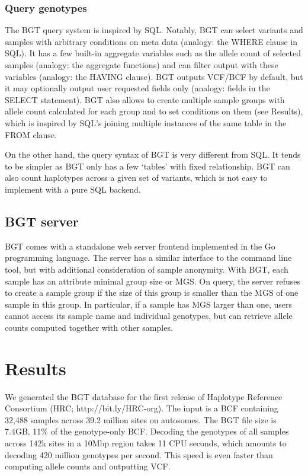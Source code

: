 \documentclass{bioinfo}
\begin{document}
\begin{methods}
\subsubsection{Query genotypes}

The BGT query system is inspired by SQL.  Notably, BGT can select variants and
samples with arbitrary conditions on meta data (analogy: the {\sf WHERE} clause
in SQL). It has a few built-in aggregate variables such as the allele count of
selected samples (analogy: the aggregate functions) and can filter output with
these variables (analogy: the {\sf HAVING} clause). BGT outputs VCF/BCF by
default, but it may optionally output user requested fields only (analogy:
fields in the {\sf SELECT} statement). BGT also allows to create multiple
sample groups with allele count calculated for each group and to set conditions
on them (see Results), which is inspired by SQL's joining multiple instances of
the same table in the {\sf FROM} clause.

On the other hand, the query syntax of BGT is very different from SQL. It tends
to be simpler as BGT only has a few `tables' with fixed relationship. BGT can
also count haplotypes across a given set of variants, which is not easy to
implement with a pure SQL backend.

\subsection{BGT server}

BGT comes with a standalone web server frontend implemented in the Go
programming language. The server has a similar interface to the command line
tool, but with additional consideration of sample anonymity. With BGT,
each sample has an attribute minimal group size or MGS. On query, the server
refuses to create a sample group if the size of this group is smaller than the
MGS of one sample in this group. In particular, if a sample has MGS larger than
one, users cannot access its sample name and individual genotypes, but can
retrieve allele counts computed together with other samples.

\end{methods}

\section{Results}

We generated the BGT database for the first release of Haplotype Reference
Consortium (HRC; http://bit.ly/HRC-org). The input is a BCF containing 32,488 samples across 39.2
million sites on autosomes. The BGT file size is 7.4GB, 11\% of the
genotype-only BCF. Decoding the genotypes of all
samples across 142k sites in a 10Mbp region takes 11 CPU seconds, which amounts
to decoding 420 million genotypes per second. This speed is even faster than
computing allele counts and outputting VCF.
\end{document}
